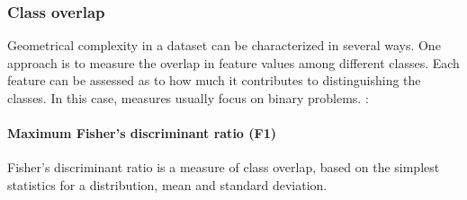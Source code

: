 \subsubsection{Class overlap}

Geometrical complexity in a dataset can be characterized in several ways. One approach is to measure the overlap in feature values among different classes. Each feature can be assessed as to how much it contributes to distinguishing the classes. In this case, measures usually focus on binary problems. :

\paragraph*{Maximum Fisher's discriminant ratio (F1)}
Fisher's discriminant ratio is a measure of class overlap, based on the simplest statistics for a distribution, mean and standard deviation. {}
